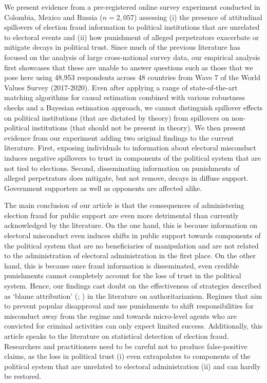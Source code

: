 \documentclass[11pt, ngerman,english,a4]{article}
\begin{document}
We present evidence from a pre-registered online survey experiment conducted in Colombia, Mexico and Russia ($n=2,057$) assessing (i) the presence of attitudinal spillovers of election fraud information to political institutions that are unrelated to electoral events and (ii) how punishment of alleged perpetrators exacerbate or mitigate decays in political trust. Since much of the previous literature has focused on the analysis of large cross-national survey data, our empirical analysis first showcases that these are unable to answer questions such as those that we pose here using 48,953 respondents across 48 countries from Wave 7 of the World Values Survey (2017-2020). Even after applying a range of state-of-the-art matching algorithms for causal estimation combined with various robustness checks and a Bayesian estimation approach, we cannot distinguish spillover effects on political institutions (that are dictated by theory) from spillovers on non-political institutions (that should not be present in theory). We then present evidence from our experiment adding two original findings to the current literature. First, exposing individuals to information about electoral misconduct induces negative spillovers to trust in components of the political system that are not tied to elections. Second, disseminating information on punishments of alleged perpetrators does mitigate, but not remove, decays in diffuse support. Government supporters as well as opponents are affected alike. 

The main conclusion of our article is that the consequences of administering election fraud for public support are even more detrimental than currently acknowledged by the literature. On the one hand, this is because information on electoral misconduct even induces shifts in public support towards components of the political system that are no beneficiaries of manipulation and are not related to the administration of electoral administration in the first place. On the other hand, this is because once fraud information is disseminated, even credible punishments cannot completely account for the loss of trust in the political system. Hence, our findings cast doubt on the effectiveness of strategies described as `blame attribution' (\citealt{Beazer2019}; \citealt{Rozenas2019b}) in the literature on authoritarianism. Regimes that aim to prevent popular disapproval and use punishments to shift responsibilities for misconduct away from the regime and towards micro-level agents who are convicted for criminal activities can only expect limited success. Additionally, this article speaks to the literature on statistical detection of election fraud. Researchers and practitioners need to be careful not to produce false-positive claims, as the loss in political trust (i) even extrapolates to components of the political system that are unrelated to electoral administration (ii) and can hardly be restored. 
\end{document}
